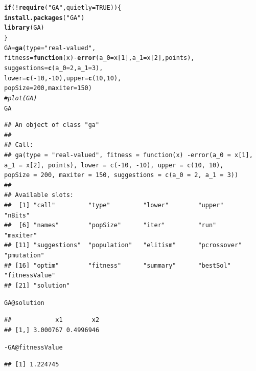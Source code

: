 \documentclass[aspectratio=169]{beamer}\usepackage[]{graphicx}\usepackage[]{xcolor}
\makeatletter
\newcommand{\hlnum}[1]{\textcolor[rgb]{0.686,0.059,0.569}{#1}}%
\newcommand{\hlsng}[1]{\textcolor[rgb]{0.192,0.494,0.8}{#1}}%
\newcommand{\hlcom}[1]{\textcolor[rgb]{0.678,0.584,0.686}{\textit{#1}}}%
\newcommand{\hlopt}[1]{\textcolor[rgb]{0,0,0}{#1}}%
\newcommand{\hldef}[1]{\textcolor[rgb]{0.345,0.345,0.345}{#1}}%
\newcommand{\hlkwa}[1]{\textcolor[rgb]{0.161,0.373,0.58}{\textbf{#1}}}%
\newcommand{\hlkwb}[1]{\textcolor[rgb]{0.69,0.353,0.396}{#1}}%
\newcommand{\hlkwc}[1]{\textcolor[rgb]{0.333,0.667,0.333}{#1}}%
\newcommand{\hlkwd}[1]{\textcolor[rgb]{0.737,0.353,0.396}{\textbf{#1}}}%
\newenvironment{kframe}{%
 \def\at@end@of@kframe{}%
 \ifinner\ifhmode%
  \def\at@end@of@kframe{\end{minipage}}%
  \begin{minipage}{\columnwidth}%
 \fi\fi%
 \def\FrameCommand##1{\hskip\@totalleftmargin \hskip-\fboxsep
 \colorbox{shadecolor}{##1}\hskip-\fboxsep
     \hskip-\linewidth \hskip-\@totalleftmargin \hskip\columnwidth}%
 \MakeFramed {\advance\hsize-\width
   \@totalleftmargin\z@ \linewidth\hsize
   \@setminipage}}%
 {\par\unskip\endMakeFramed%
 \at@end@of@kframe}
\newenvironment{knitrout}{}{} %
\makeatother
\begin{document}
\begin{frame}[fragile]
\begin{knitrout}
\color{fgcolor}\begin{kframe}
\begin{alltt}
\hlkwa{if} \hldef{(}\hlopt{!}\hlkwd{require}\hldef{(}\hlsng{"GA"}\hldef{,} \hlkwc{quietly} \hldef{=} \hlnum{TRUE}\hldef{)) \{}
  \hlkwd{install.packages}\hldef{(}\hlsng{"GA"}\hldef{)}
  \hlkwd{library}\hldef{(GA)}
\hldef{\}}
\hldef{GA} \hlkwb{=} \hlkwd{ga}\hldef{(}\hlkwc{type} \hldef{=} \hlsng{"real-valued"}\hldef{,}
        \hlkwc{fitness} \hldef{=} \hlkwa{function}\hldef{(}\hlkwc{x}\hldef{)} \hlopt{-}\hlkwd{error}\hldef{(}\hlkwc{a_0} \hldef{= x[}\hlnum{1}\hldef{],} \hlkwc{a_1} \hldef{= x[}\hlnum{2}\hldef{], points),}
        \hlkwc{suggestions} \hldef{=} \hlkwd{c}\hldef{(}\hlkwc{a_0} \hldef{=} \hlnum{2}\hldef{,} \hlkwc{a_1} \hldef{=} \hlnum{3}\hldef{),}
        \hlkwc{lower} \hldef{=} \hlkwd{c}\hldef{(}\hlopt{-}\hlnum{10}\hldef{,} \hlopt{-}\hlnum{10}\hldef{),} \hlkwc{upper} \hldef{=} \hlkwd{c}\hldef{(}\hlnum{10}\hldef{,} \hlnum{10}\hldef{),}
        \hlkwc{popSize} \hldef{=} \hlnum{200}\hldef{,} \hlkwc{maxiter} \hldef{=} \hlnum{150}\hldef{)}
\hlcom{# plot(GA)}
\hldef{GA}
\end{alltt}
\begin{verbatim}
## An object of class "ga"
## 
## Call:
## ga(type = "real-valued", fitness = function(x) -error(a_0 = x[1],     a_1 = x[2], points), lower = c(-10, -10), upper = c(10, 10),     popSize = 200, maxiter = 150, suggestions = c(a_0 = 2, a_1 = 3))
## 
## Available slots:
##  [1] "call"         "type"         "lower"        "upper"        "nBits"       
##  [6] "names"        "popSize"      "iter"         "run"          "maxiter"     
## [11] "suggestions"  "population"   "elitism"      "pcrossover"   "pmutation"   
## [16] "optim"        "fitness"      "summary"      "bestSol"      "fitnessValue"
## [21] "solution"
\end{verbatim}
\begin{alltt}
\hldef{GA}\hlopt{@}\hlkwc{solution}
\end{alltt}
\begin{verbatim}
##            x1        x2
## [1,] 3.000767 0.4996946
\end{verbatim}
\begin{alltt}
\hlopt{-}\hldef{GA}\hlopt{@}\hlkwc{fitnessValue}
\end{alltt}
\begin{verbatim}
## [1] 1.224745
\end{verbatim}
\end{kframe}
\end{knitrout}
\end{frame}
\end{document}
